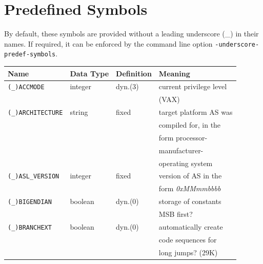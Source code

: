 \documentclass[12pt,twoside]{report}
\newcommand{\tty}[1]{{\tt #1}}
\newcommand{\asname}{{AS}}
\newcommand{\predefsym}[1]{{\tt (\_)#1}}
\begin{document}
\newcommand{\pcsymname}[0]{Program Counter Symbol}



\cleardoublepage
\chapter{Predefined Symbols}
\label{AppInternSyms}

By default, these symbols are provided without a leading underscore (\_) in
their names.  If required, it can be enforced by the command line option
\tty{-underscore-predef-symbols}.

\begin{center}\begin{longtable}{|l|l|l|l|}
\hline
Name                   & Data Type   & Definition & Meaning \\
\hline
\hline
\endhead
\predefsym{ACCMODE}    & integer     & dyn.(3)    & current privilege level \\
                       &             &            & (VAX) \\
\hline
\predefsym{ARCHITECTURE} & string    & fixed      & target platform \asname{} was \\
                       &             &            & compiled for, in the \\
                       &             &            & form processor- \\
                       &             &            & manufacturer- \\
                       &             &            & operating system \\
\hline
\predefsym{ASL\_VERSION} & integer   & fixed      & version of \asname{} in the \\
                       &             &            & form {\em 0xMMmmbbbb} \\
\hline
\predefsym{BIGENDIAN}  & boolean     & dyn.(0)    & storage of constants \\
                       &             &            & MSB first? \\
\hline
\predefsym{BRANCHEXT}  & boolean     & dyn.(0)    & automatically create \\
                       &             &            & code sequences for \\
                       &             &            & long jumps? (29K) \\

\end{longtable}
\end{center}
\end{document}
